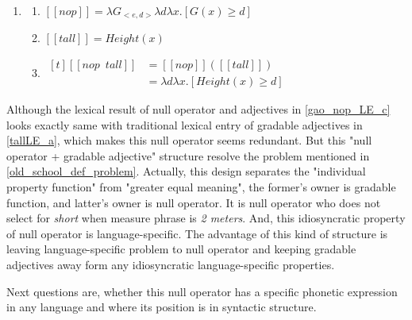 \documentclass{ctexart}
\begin{document}
\begin{enumerate}[resume]
    \item \label{gao_nop_LE}

    \begin{enumerate}[ref=(\arabic{enumi}\alph*)]
        \item \label{gao_nop_LE_a} 
        $[\![nop]\!]=\lambda G_{<e,d>}\lambda d \lambda x.[G(x) \geq d]$

        \item \label{gao_nop_LE_b} 
        $[\![tall]\!]=Height(x)$

        \item \label{gao_nop_LE_c} 
        $\begin{aligned}[t]
            [\![nop \enspace tall]\!] &= [\![nop]\!]([\![tall]\!]) \\
            &= \lambda d \lambda x.[Height(x) \geq d]
        \end{aligned}$

    \end{enumerate}
\end{enumerate}

Although the lexical result of null operator and adjectives in \ref{gao_nop_LE_c} looks exactly same with traditional lexical entry of gradable adjectives in \ref{tallLE_a}, which makes this null operator seems redundant. But this "null operator + gradable adjective" structure resolve the problem mentioned in \ref{old_school_def_problem}. Actually, this design separates the "individual property function" from "greater equal meaning", the former's owner is gradable function, and latter's owner is null operator. It is null operator who does not select for \textit{short} when measure phrase is \textit{2 meters}. And, this idiosyncratic property of null operator is language-specific. The advantage of this kind of structure is leaving language-specific problem to null operator and keeping gradable adjectives away form any idiosyncratic language-specific properties.

Next questions are, whether this null operator has a specific phonetic expression in any language and where its position is in syntactic structure. 
\end{document}
